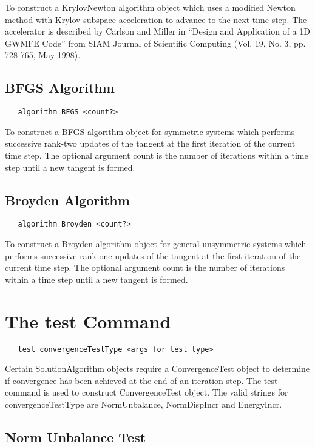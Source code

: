 \documentclass[12pt]{article}
\begin{document}
To construct a KrylovNewton algorithm object which uses a modified Newton method with
Krylov subspace acceleration to advance to the next time step. The accelerator is described
by Carlson and Miller in ``Design and Application of a 1D GWMFE Code'' from SIAM Journal of
Scientific Computing (Vol. 19, No. 3, pp. 728-765, May 1998).


\subsection {BFGS Algorithm}
{\sf\small
\begin{verbatim}
   algorithm BFGS <count?>
\end{verbatim}
}

To construct a BFGS algorithm object for symmetric systems which performs successive rank-two
updates of the tangent at the first iteration of the current time step. The optional argument
count is the number of iterations within a time step until a new tangent is formed.

\subsection {Broyden Algorithm}
{\sf\small
\begin{verbatim}
   algorithm Broyden <count?>
\end{verbatim}
}

To construct a Broyden algorithm object for general unsymmetric systems which performs successive
rank-one updates of the tangent at the first iteration of the current time step. The optional argument
count is the number of iterations within a time step until a new tangent is formed.

\section {The test Command}

{\sf\small
\begin{verbatim}
   test convergenceTestType <args for test type>
\end{verbatim}
}

Certain SolutionAlgorithm objects require a ConvergenceTest object to
determine if convergence has been achieved at the end of an iteration
step. The test command is used to construct ConvergenceTest object. The
valid strings for convergenceTestType are NormUnbalance, NormDispIncr
and EnergyIncr.

\subsection{Norm Unbalance Test}
\end{document}
